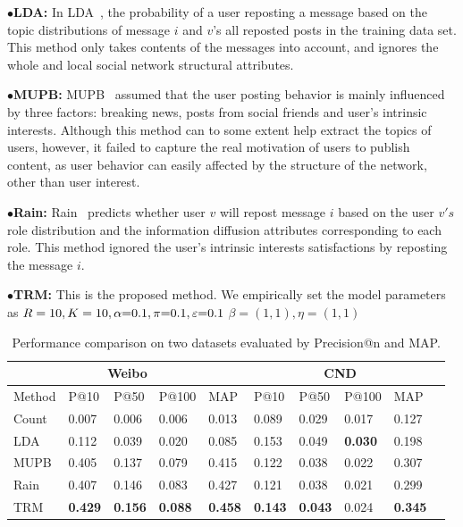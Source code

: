 \documentclass[runningheads,a4paper]{llncs}
\begin{document}
\noindent$\bullet$\textbf{LDA}\textbf{:} In LDA~\cite{blei2003latent}, the probability of a user reposting a message based on the topic distributions of  message $i$ and $v$'s all reposted posts in the training data set. This method only takes contents of the messages into account, and ignores the whole and local social network structural attributes.

\noindent$\bullet$\textbf{MUPB}\textbf{:} MUPB~\cite{xu2012modeling} assumed that the user posting behavior is mainly influenced by three factors: breaking news, posts from social friends and user's intrinsic interests. Although this method can to some extent help extract the topics of users, however, it failed to capture the real motivation of users to publish content, as user behavior can easily affected by the structure of the network, other than user interest.

\noindent$\bullet$\textbf{Rain}\textbf{:} Rain~\cite{yang2015rain} predicts whether user $v$ will repost message $i$ based on the user $v's$ role distribution and the information diffusion attributes corresponding to each role. This method ignored the user's intrinsic interests satisfactions by reposting the message $i$.


\noindent$\bullet$\textbf{TRM}\textbf{:} This is the proposed method.
We empirically set the model parameters as $R=10,K=10,\alpha {\rm{ = }}0.1,\pi {\rm{ = }}0.1 ,\varepsilon {\rm{ = }}0.1$
$\beta  = (1,1),\eta  = (1,1)$

\vspace{-20pt}
\begin{table}[h]
\centering
\caption{Performance comparison on two datasets evaluated by Precision@n and MAP.}
  \begin{tabular}{p{1.5cm}<{\centering}|p{1.2cm}<{\centering}p{1.2cm}<{\centering}p{1.2cm}<{\centering}p{1.2cm}<{\centering}|p{1.2cm}<{\centering}p{1.2cm}<{\centering}p{1.2cm}<{\centering}p{1.2cm}<{\centering}p{1.2cm}<{\centering}}
\hline
\hline
\multicolumn{5}{c|}{Weibo}  & \multicolumn{4}{c}{CND} \\
\hline

 Method &  P@10&  P@50& P@100& MAP & P@10&  P@50& P@100& MAP \\
\hline

 Count     & 0.007 &0.006 &0.006   &0.013  &0.089 & 0.029 &0.017  &0.127\\
\hline
 LDA     & 0.112 &0.039 &0.020   &0.085  &0.153 &0.049 & \textbf{0.030} &0.198\\
\hline
 MUPB     & 0.405 &0.137 &0.079   &0.415   &0.122&0.038&0.022 &0.307\\
\hline
 Rain     & 0.407 &0.146 &0.083   &0.427  &0.121 &0.038 &0.021 &0.299\\
\hline
TRM     &\textbf{ 0.429} &\textbf{0.156} &\textbf{0.088}   &\textbf{0.458} &\textbf{ 0.143} &\textbf{0.043} &0.024   &\textbf{0.345}\\
 \hline
\end{tabular}
 \label{results}
\vspace{-10pt}
\end{table}
\end{document}
